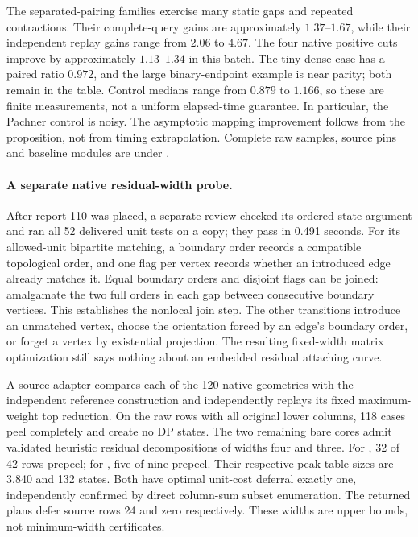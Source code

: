 \begin{center}\small

\end{center}

The separated-pairing families exercise many static gaps and repeated
contractions. Their complete-query gains are approximately $1.37$--$1.67$,
while their independent replay gains range from $2.06$ to $4.67$.
The four native positive cuts improve by approximately $1.13$--$1.34$ in
this batch. The tiny dense case has a paired ratio $0.972$, and the large
binary-endpoint example is near parity; both remain in the table. Control
medians range from $0.879$ to $1.166$, so these are finite measurements,
not a uniform elapsed-time guarantee. In particular, the Pachner control
is noisy. The asymptotic mapping improvement follows from the proposition,
not from timing extrapolation. Complete raw samples, source pins and
baseline modules are under .

\paragraph{A separate native residual-width probe.}
After report 110 was placed, a separate review checked its ordered-state
argument and ran all 52 delivered unit tests on a copy; they pass in
0.491 seconds. For its allowed-unit bipartite matching, a boundary order
records a compatible topological order, and one flag per vertex records
whether an introduced edge already matches it. Equal boundary orders and
disjoint flags can be joined: amalgamate the two full orders in each gap
between consecutive boundary vertices. This establishes the nonlocal
join step. The other transitions introduce an unmatched vertex, choose
the orientation forced by an edge's boundary order, or forget a vertex
by existential projection. The resulting fixed-width matrix optimization
still says nothing about an embedded residual attaching curve.

A source adapter compares each of the 120 native geometries with the
independent reference construction and independently replays its fixed
maximum-weight top reduction. On the raw rows with all original lower
columns, 118 cases peel completely and create no DP states. The two
remaining bare cores admit validated heuristic residual decompositions
of widths four and three. For
, 32 of 42 rows prepeel; for
, five of nine prepeel. Their respective
peak table sizes are 3,840 and 132 states. Both have optimal unit-cost
deferral exactly one, independently confirmed by direct column-sum subset
enumeration. The returned plans defer source rows 24 and zero respectively.
These widths are upper bounds, not minimum-width certificates.

